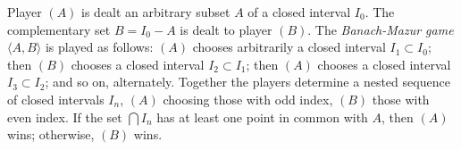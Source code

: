 Player $(A)$ is dealt an arbitrary subset $A$ of a closed interval $I_0$. The complementary set $B = I_0 - A$ is dealt to player $(B)$. The \emph{Banach-Mazur game} $\langle A, B \rangle$ is played as follows: $(A)$ chooses arbitrarily a closed interval $I_1 \subset I_0$; then $(B)$ chooses a closed interval $I_2 \subset I_1$; then $(A)$ chooses a closed interval $I_3 \subset I_2$; and so on, alternately. Together the players determine a nested sequence of closed intervals $I_n$, $(A)$ choosing those with odd index, $(B)$ those with even index. If the set $\bigcap I_n$ has at least one point in common with $A$, then $(A)$ wins; otherwise, $(B)$ wins.
